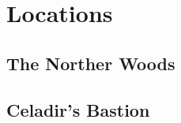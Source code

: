 \documentclass{report}
\newif\ifdm
\newcommand{\dmonly}[1]{\ifdm{\color{blue}\textit{[DM Only:]} #1}\else{}\fi}
\begin{document}
  \dmonly{{\LARGE
    This is the DM copy.
    If you're a player, this will have spoilers.
  }}


  \tableofcontents


  \chapter{Locations}\label{ch:locations}

  \section{The Norther Woods}\label{sec:theNortherWoods}
  \section{Celadir's Bastion}\label{sec:celadir'sBastion}
\end{document}
